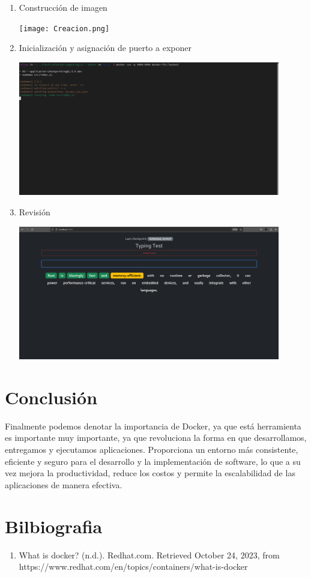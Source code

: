 \documentclass{dense_template}
\begin{document}
 \begin{enumerate}
     \item Construcción de imagen
    \begin{center}
        \vspace{1cm}
        \texttt{[image: Creacion.png]}
    \end{center}
    \item Inicialización y asignación de puerto a exponer
    \begin{center}
        \vspace{1cm}
        \includegraphics[width=0.9\textwidth]{Docker-run.png}
    \end{center}
    \item Revisión
    \begin{center}
        \vspace{1cm}
        \includegraphics[width=0.9\textwidth]{App.png}
    \end{center}
 \end{enumerate}
\pagebreak
\section{Conclusión}
Finalmente podemos denotar la importancia de Docker, ya que está herramienta es importante muy importante, ya que revoluciona la forma en que desarrollamos, entregamos y ejecutamos aplicaciones. Proporciona un entorno más consistente, eficiente y seguro para el desarrollo y la implementación de software, lo que a su vez mejora la productividad, reduce los costos y permite la escalabilidad de las aplicaciones de manera efectiva.

\pagebreak
\section{Bilbiografia}
\sloppy
\begin{enumerate}
    \item What is docker? (n.d.). Redhat.com. Retrieved October 24, 2023, from https://www.redhat.com/en/topics/containers/what-is-docker
\end{enumerate}
\end{document}
